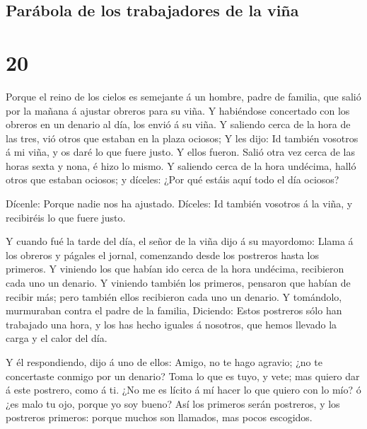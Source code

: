 \hypertarget{paruxe1bola-de-los-trabajadores-de-la-viuxf1a}{%
\subsection{Parábola de los trabajadores de la
viña}\label{paruxe1bola-de-los-trabajadores-de-la-viuxf1a}}

\hypertarget{section-40-20}{%
\section{20}\label{section-40-20}}

 Porque el reino de los cielos es semejante á un hombre,
padre de familia, que salió por la mañana á ajustar obreros para su
viña.  Y habiéndose concertado con los obreros en un
denario al día, los envió á su viña.  Y saliendo cerca de
la hora de las tres, vió otros que estaban en la plaza ociosos;
 Y les dijo: Id también vosotros á mi viña, y os daré lo
que fuere justo. Y ellos fueron.  Salió otra vez cerca de
las horas sexta y nona, é hizo lo mismo.  Y saliendo cerca
de la hora undécima, halló otros que estaban ociosos; y díceles: ¿Por
qué estáis aquí todo el día ociosos?

 Dícenle: Porque nadie nos ha ajustado. Díceles: Id
también vosotros á la viña, y recibiréis lo que fuere justo.

 Y cuando fué la tarde del día, el señor de la viña dijo á
su mayordomo: Llama á los obreros y págales el jornal, comenzando desde
los postreros hasta los primeros.  Y viniendo los que
habían ido cerca de la hora undécima, recibieron cada uno un denario.
 Y viniendo también los primeros, pensaron que habían de
recibir más; pero también ellos recibieron cada uno un denario.
 Y tomándolo, murmuraban contra el padre de la familia,
 Diciendo: Estos postreros sólo han trabajado una hora, y
los has hecho iguales á nosotros, que hemos llevado la carga y el calor
del día.

 Y él respondiendo, dijo á uno de ellos: Amigo, no te
hago agravio; ¿no te concertaste conmigo por un denario? 
Toma lo que es tuyo, y vete; mas quiero dar á este postrero, como á ti.
 ¿No me es lícito á mí hacer lo que quiero con lo mío? ó
¿es malo tu ojo, porque yo soy bueno?  Así los primeros
serán postreros, y los postreros primeros: porque muchos son llamados,
mas pocos escogidos.


